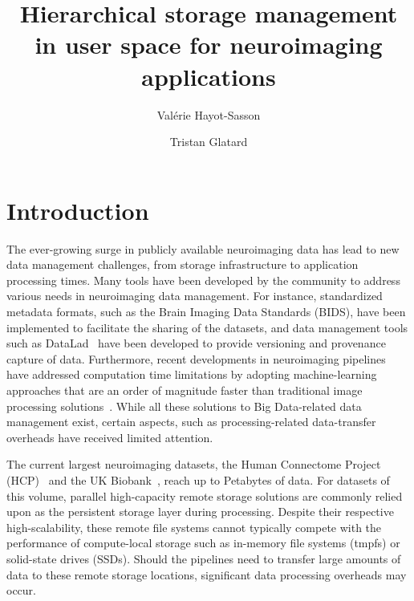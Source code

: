 \documentclass[fleqn,10pt]{wlscirep}
\title{Hierarchical storage management in user space for neuroimaging applications}
\author{Val\'erie Hayot-Sasson}
\author{Tristan Glatard}
\affil{Department of Computer Science and Software Engineering, Concordia University, Montreal, Canada}
\begin{document}
\flushbottom
\maketitle

\thispagestyle{empty}


 
  \section{Introduction}\label{sec:sea_neuro:introduction}
    
    The ever-growing surge in publicly available neuroimaging data has lead to new data
    management challenges, from storage infrastructure to application processing times.
    Many tools have been developed by the community to address various needs in 
    neuroimaging data management.
    For instance, standardized metadata formats, such as the Brain Imaging Data Standards (BIDS)\cite{gorgolewski2016brain},
    have been implemented to facilitate the sharing
    of the datasets, and data management tools such as DataLad~\cite{halchenko2021datalad} have been developed to provide 
    versioning and provenance capture of data.
    Furthermore, recent developments in neuroimaging pipelines have addressed computation time 
    limitations by adopting machine-learning approaches that are an order of magnitude faster than traditional image processing solutions~\cite{henschel2020fastsurfer,hoffmann2021synthmorph}.
    While all these solutions to Big Data-related data management exist, certain aspects, 
    such as processing-related data-transfer overheads
    have received limited attention.

    The current largest neuroimaging datasets,
    the Human Connectome Project (HCP)~\cite{HCP} and the UK
    Biobank~\cite{ukbiobank}, reach up to Petabytes of data. For datasets of this
    volume, parallel high-capacity remote storage solutions are commonly relied
    upon as the persistent storage layer during processing. 
    Despite their respective high-scalability, these remote file systems cannot typically
    compete with the performance of compute-local storage such as in-memory file systems (tmpfs) or solid-state drives (SSDs). Should the pipelines 
    need to transfer large amounts of data to these remote storage locations, significant data
    processing overheads may occur.
\end{document}
